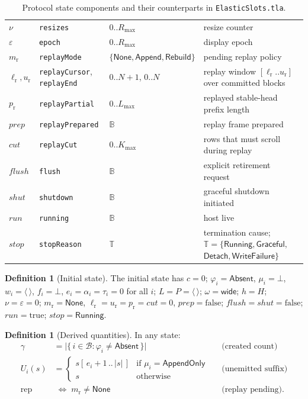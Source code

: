 \documentclass[11pt]{article}
\newcommand{\seq}[1]{\langle #1\rangle}
\newcommand{\emptyseq}{\seq{\,}}
\newcommand{\len}[1]{\lvert #1\rvert}
\newcommand{\Blocks}{\mathcal{B}}
\newcommand{\NoFinal}{\bot}
\newcommand{\Undecl}{\bot}
\newcommand{\AppendOnly}{\mathsf{AppendOnly}}
\newcommand{\Absent}{\mathsf{Absent}}
\newcommand{\wide}{\mathsf{wide}}
\newcommand{\AppendPol}{\mathsf{Append}}
\newcommand{\Rebuild}{\mathsf{Rebuild}}
\newcommand{\None}{\mathsf{None}}
\newcommand{\stRun}{\mathsf{Running}}
\newcommand{\stGrace}{\mathsf{Graceful}}
\newcommand{\stDetach}{\mathsf{Detach}}
\newcommand{\stWF}{\mathsf{WriteFailure}}
\newcommand{\Un}{U}
\newcommand{\Repl}{\mathrm{rep}}
\newcommand{\Ledger}{L}
\newcommand{\Native}{P}
\newcommand{\rmode}{m_{\mathrm{r}}}
\newcommand{\rcur}{\ell_{\mathrm{r}}}
\newcommand{\rend}{u_{\mathrm{r}}}
\newcommand{\rpart}{p_{\mathrm{r}}}
\newcommand{\rprep}{\mathit{prep}}
\newcommand{\rcut}{\mathit{cut}}
\newcommand{\flush}{\mathit{flush}}
\newcommand{\shut}{\mathit{shut}}
\newcommand{\run}{\mathit{run}}
\newcommand{\stopr}{\mathit{stop}}
\newcommand{\created}{\gamma}
\newcommand{\MaxRes}{R_{\max}}
\newcommand{\Lmax}{L_{\max}}
\newcommand{\Fmax}{K_{\max}}
\newcommand{\tla}[1]{\texttt{#1}}
\theoremstyle{definition}
\newtheorem{definition}[theorem]{Definition}
\theoremstyle{remark}
\begin{document}
\begin{table}[htbp]
\begin{tabular}{@{}lllp{5.9cm}@{}}
$\nu$ & \tla{resizes} & $0..\MaxRes$ & resize counter \\
$\varepsilon$ & \tla{epoch} & $0..\MaxRes$ & display epoch \\
$\rmode$ & \tla{replayMode} & $\{\None,\AppendPol,\Rebuild\}$ & pending
  replay policy \\
$\rcur,\rend$ & \tla{replayCursor}, \tla{replayEnd} & $0..N{+}1$, $0..N$ &
  replay window $[\rcur..\rend]$ over committed blocks \\
$\rpart$ & \tla{replayPartial} & $0..\Lmax$ & replayed stable-head prefix
  length \\
$\rprep$ & \tla{replayPrepared} & $\mathbb{B}$ & replay frame prepared \\
$\rcut$ & \tla{replayCut} & $0..\Fmax$ & rows that must scroll during replay \\
$\flush$ & \tla{flush} & $\mathbb{B}$ & explicit retirement request \\
$\shut$ & \tla{shutdown} & $\mathbb{B}$ & graceful shutdown initiated \\
$\run$ & \tla{running} & $\mathbb{B}$ & host live \\
$\stopr$ & \tla{stopReason} & $\mathbb{T}$ &
  termination cause; $\mathbb{T}=\{\stRun,\stGrace,$
  $\stDetach,\stWF\}$ \\
\bottomrule
\end{tabular}
\caption{Protocol state components and their counterparts in
\texttt{ElasticSlots.tla}.}
\label{tab:state}
\end{table}

\begin{definition}[Initial state]\label{def:init}
The initial state has $c=0$; $\varphi_i=\Absent$, $\mu_i=\Undecl$,
$w_i=\emptyseq$, $f_i=\NoFinal$, $e_i=\alpha_i=\tau_i=0$ for all $i$;
$\Ledger=\Native=\emptyseq$; $\omega=\wide$; $h=H$; $\nu=\varepsilon=0$;
$\rmode=\None$, $\rcur=\rend=\rpart=\rcut=0$, $\rprep=\mathrm{false}$;
$\flush=\shut=\mathrm{false}$; $\run=\mathrm{true}$; $\stopr=\stRun$.
\end{definition}

\begin{definition}[Derived quantities]\label{def:derived}
In any state:
\begin{align*}
\created &= \bigl|\{\,i\in\Blocks : \varphi_i\ne\Absent\,\}\bigr|
  &&\text{(created count)}\\
\Un_i(s) &= \begin{cases}
  s[\,e_i{+}1\,..\,\len{s}\,] & \text{if } \mu_i=\AppendOnly\\
  s & \text{otherwise}
\end{cases}
  &&\text{(unemitted suffix)}\\
\Repl &\;\iff\; \rmode\ne\None &&\text{(replay pending).}
\end{align*}
\end{definition}
\end{document}
